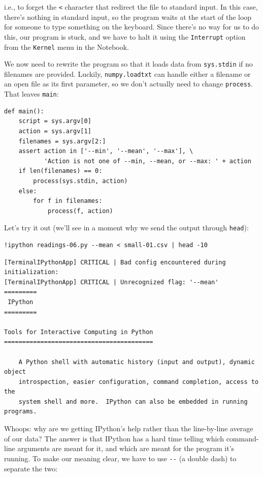\documentclass{book}
\begin{document}
i.e., to forget the \texttt{\textless{}} character that redirect the
file to standard input. In this case, there's nothing in standard input,
so the program waits at the start of the loop for someone to type
something on the keyboard. Since there's no way for us to do this, our
program is stuck, and we have to halt it using the \texttt{Interrupt}
option from the \texttt{Kernel} menu in the Notebook.

We now need to rewrite the program so that it loads data from
\texttt{sys.stdin} if no filenames are provided. Luckily,
\texttt{numpy.loadtxt} can handle either a filename or an open file as
its first parameter, so we don't actually need to change
\texttt{process}. That leaves \texttt{main}:

\begin{verbatim}
def main():
    script = sys.argv[0]
    action = sys.argv[1]
    filenames = sys.argv[2:]
    assert action in ['--min', '--mean', '--max'], \
           'Action is not one of --min, --mean, or --max: ' + action
    if len(filenames) == 0:
        process(sys.stdin, action)
    else:
        for f in filenames:
            process(f, action)
\end{verbatim}

Let's try it out (we'll see in a moment why we send the output through
\texttt{head}):

\begin{verbatim}
!ipython readings-06.py --mean < small-01.csv | head -10
\end{verbatim}

\begin{verbatim}
[TerminalIPythonApp] CRITICAL | Bad config encountered during initialization:
[TerminalIPythonApp] CRITICAL | Unrecognized flag: '--mean'
=========
 IPython
=========

Tools for Interactive Computing in Python
=========================================

    A Python shell with automatic history (input and output), dynamic object
    introspection, easier configuration, command completion, access to the
    system shell and more.  IPython can also be embedded in running programs.
\end{verbatim}

Whoops: why are we getting IPython's help rather than the line-by-line
average of our data? The answer is that IPython has a hard time telling
which command-line arguments are meant for it, and which are meant for
the program it's running. To make our meaning clear, we have to use
\texttt{-{}-} (a double dash) to separate the two:
\end{document}
